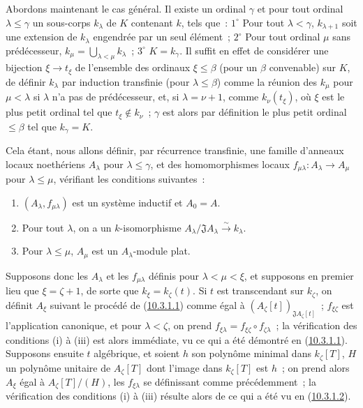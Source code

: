 \begin{env}[10.3.1.4]
\label{0.10.3.1.4-fr}
Abordons maintenant le cas général. Il existe un ordinal $\gamma$ et pour
tout ordinal $\lambda\leq\gamma$ un sous-corps $k_\lambda$ de $K$ contenant
$k$, tels que~: $1^\circ$ Pour tout $\lambda<\gamma$, $k_{\lambda+1}$ soit
une extension de $k_\lambda$ engendrée par un seul élément~; $2^\circ$ Pour
tout ordinal $\mu$ sans prédécesseur,
$k_\mu=\bigcup_{\lambda<\mu}k_\lambda$~; $3^\circ$ $K=k_\gamma$. Il suffit en
effet de considérer une bijection $\xi\to t_\xi$ de l'ensemble des
ordinaux $\xi\leq\beta$ (pour un $\beta$ convenable) sur $K$, de définir
$k_\lambda$ par induction transfinie (pour $\lambda\leq\beta$) comme la
réunion des $k_\mu$ pour $\mu<\lambda$ si $\lambda$ n'a pas de prédécesseur,
et, si $\lambda=\nu+1$, comme $k_\nu(t_\xi)$, où $\xi$ est le plus petit
ordinal tel que $t_\xi\notin k_\nu$~; $\gamma$ est alors par définition le plus
petit ordinal $\leq\beta$ tel que $k_\gamma=K$.

Cela étant, nous allons définir, par récurrence transfinie, une famille
d'anneaux locaux noethériens $A_\lambda$ pour $\lambda\leq\gamma$, et des
homomorphismes locaux $f_{\mu\lambda}:A_\lambda\to A_\mu$ pour
$\lambda\leq\mu$, vérifiant les conditions suivantes~:
\begin{enumerate}
  \item[(i)] $(A_\lambda,f_{\mu\lambda})$ est un système inductif et $A_0=A$.
  \item[(ii)] Pour tout $\lambda$, on a un $k$-isomorphisme
    $A_\lambda/\mathfrak J A_\lambda\xrightarrow{\sim}k_\lambda$.
  \item[(iii)] Pour $\lambda\leq\mu$, $A_\mu$ est un $A_\lambda$-module plat.
\end{enumerate}

Supposons donc les $A_\lambda$ et les $f_{\mu\lambda}$ définis pour
$\lambda<\mu<\xi$, et supposons en premier lieu que $\xi=\zeta+1$, de sorte
que $k_\xi=k_\zeta(t)$. Si $t$ est transcendant sur $k_\zeta$, on définit
$A_\xi$ suivant le procédé de (\hyperref[0.10.3.1.1-fr]{10.3.1.1}) comme
égal à $(A_\zeta[t])_{\mathfrak J A_\zeta[t]}$~;
$f_{\xi\zeta}$ est l'application canonique, et pour $\lambda<\zeta$, on prend
$f_{\xi\lambda}=f_{\xi\zeta}\circ f_{\zeta\lambda}$~; la vérification des
conditions (i) à (iii) est alors immédiate, vu ce qui a été démontré en
(\hyperref[0.10.3.1.1-fr]{10.3.1.1}). Supposons ensuite $t$ algébrique, et
soient $h$ son polynôme minimal dans $k_\zeta[T]$, $H$ un polynôme unitaire de
$A_\zeta[T]$ dont l'image dans $k_\zeta[T]$ est $h$~; on prend alors $A_\xi$
égal à $A_\zeta[T]/(H)$, les $f_{\xi\lambda}$ se définissant comme
précédemment~; la vérification des conditions (i) à (iii) résulte alors de
ce qui a été vu en (\hyperref[0.10.3.1.2-fr]{10.3.1.2}).


\end{env}
